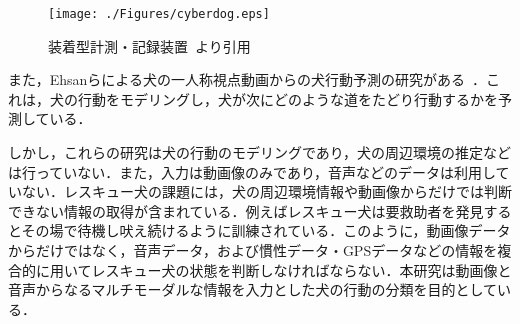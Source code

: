 \begin{figure}[htbp]
 \begin{center}
  \texttt{[image: ./Figures/cyberdog.eps]}
  \caption{装着型計測・記録装置~\cite{dog01}より引用}
  \label{cyber}
 \end{center}
\end{figure}

また，Ehsanらによる犬の一人称視点動画からの犬行動予測の研究がある~\cite{whoretthedog}．これは，犬の行動をモデリングし，犬が次にどのような道をたどり行動するかを予測している．

しかし，これらの研究は犬の行動のモデリングであり，犬の周辺環境の推定などは行っていない．また，入力は動画像のみであり，音声などのデータは利用していない．レスキュー犬の課題には，犬の周辺環境情報や動画像からだけでは判断できない情報の取得が含まれている．例えばレスキュー犬は要救助者を発見するとその場で待機し吠え続けるように訓練されている．このように，動画像データからだけではなく，音声データ，および慣性データ・GPSデータなどの情報を複合的に用いてレスキュー犬の状態を判断しなければならない．本研究は動画像と音声からなるマルチモーダルな情報を入力とした犬の行動の分類を目的としている． 

